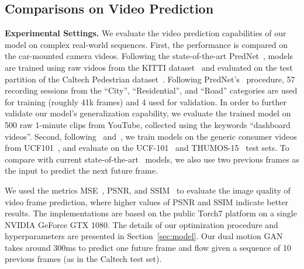 \documentclass[10pt,twocolumn,letterpaper]{article}
\newcommand{\lisa}[1]{{\color{blue}#1}}
\begin{document}
	\subsection{Comparisons on Video Prediction}
	\textbf{Experimental Settings.} We evaluate the video prediction capabilities of our model on complex real-world sequences. First, the performance is compared on the car-mounted camera videos. Following the state-of-the-art PredNet~\cite{lotter2016deep}, models are trained using raw videos from the KITTI dataset~\cite{geiger2013vision} and evaluated on the test partition of the Caltech Pedestrian dataset~\cite{dollar2009pedestrian}. Following PredNet's~\cite{lotter2016deep} procedure, 57 recording sessions from the “City”, “Residential”, and “Road” categories are used for training (roughly 41k frames) and 4 used for validation. In order to further validate our model's generalization capability, we evaluate the trained model on 500 raw 1-minute clips from YouTube, collected using the keywords ``dashboard videos''. Second, following~\cite{mathieu2015deep} and~\cite{liu2017video}, we train models on the generic consumer videos from UCF101~\cite{soomro2012ucf101}, and evaluate on the UCF-101~\cite{soomro2012ucf101} and THUMOS-15~\cite{gorban2015thumos} test sets. To compare with current state-of-the-art~\cite{liu2017video} models, we also use two previous frames as the input to predict the next future frame.
	
	We used the metrics MSE~\cite{lotter2016deep}, PSNR, and SSIM~\cite{wang2004image} to evaluate the image quality of video frame prediction, where higher values of PSNR and SSIM indicate better results. The implementations are based on the public Torch7 platform on a single NVIDIA GeForce GTX 1080. The details of our optimization procedure and hyperparameters are presented in Section~\ref{sec:model}. Our dual motion GAN takes around 300ms to predict one future frame and flow given a sequence of 10 previous frames (as in the Caltech test set).
	
\end{document}
